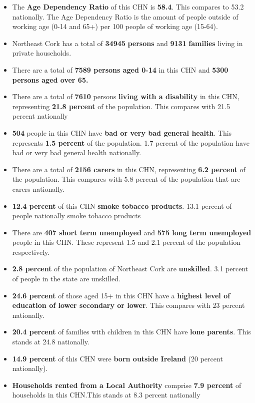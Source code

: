 \documentclass{article}
\begin{document}
\begin{itemize}

\item The \textbf{Age Dependency Ratio} of this CHN is  \textbf{58.4}. This compares to 53.2 nationally. The Age Dependency Ratio is the amount of people outside of working age (0-14 and 65+) per 100 people of working age (15-64). 

\item Northeast Cork has a total of \textbf{\num{34945}} \textbf{persons} and  \textbf{\num{9131}} \textbf{families} living in private households.

\item There are a total of \textbf{\num{7589} persons aged 0-14} in this CHN and \textbf{\num{5300} persons aged over 65.} 

\item There are a total of \textbf{\num{7610}} persons \textbf{living with a disability} in this CHN, representing \textbf{21.8 percent} of the population. This compares with  21.5 percent nationally

\item \textbf{\num{504}} people in this CHN have \textbf{bad or very bad general health}. This represents \textbf{1.5 percent} of the population. 1.7 percent of the population have bad or very bad general health nationally. 

\item There are a total of \textbf{\num{2156} carers} in this CHN, representing \textbf{6.2 percent} of the population. This compares with 5.8 percent of the population that are carers nationally. 

\item \textbf{12.4 percent} of this CHN \textbf{smoke tobacco products}. 13.1 percent of people nationally smoke tobacco products

\item There are \textbf{\num{407} short term unemployed} and \textbf{\num{575} long term unemployed} people in this CHN. These represent 1.5 and 2.1 percent of the population respectively.

\item  \textbf{2.8 percent} of the population of Northeast Cork are \textbf{unskilled}. 3.1 percent of people in the state are unskilled.

\item \textbf{24.6 percent} of those aged 15+ in this CHN have a \textbf{highest level of education of lower secondary or lower}. This compares with 23 percent nationally. 

\item \textbf{20.4 percent} of families with children in this CHN have \textbf{lone parents}. This stands at 24.8 nationally.

\item \textbf{14.9 percent} of this CHN were \textbf{born outside Ireland} (20 percent nationally).

\item \textbf{Households rented from a Local Authority} comprise \textbf{7.9 percent} of households in this CHN.This stands at 8.3 percent nationally

\end{itemize}
\end{document}
